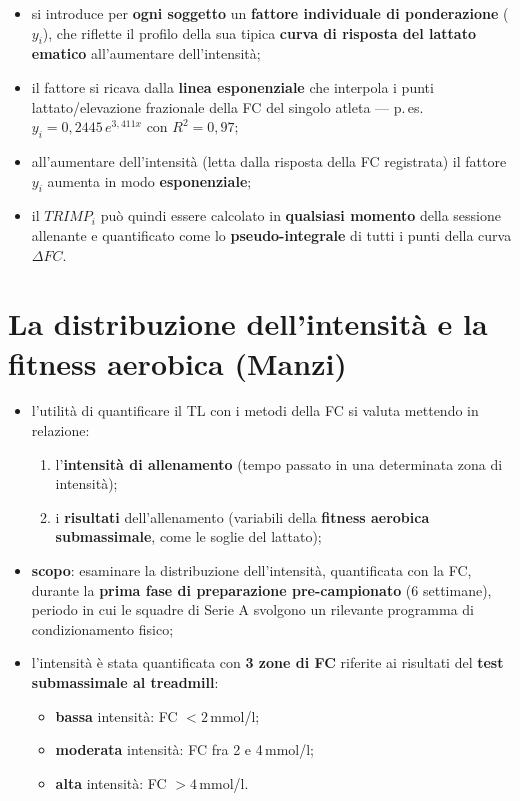 \begin{itemize}
  \item si introduce per \textbf{ogni soggetto} un \textbf{fattore individuale di ponderazione}
    ($y_i$), che riflette il profilo della sua tipica \textbf{curva di risposta del lattato ematico}
    all'aumentare dell'intensità;
  \item il fattore si ricava dalla \textbf{linea esponenziale} che interpola i punti
    lattato/elevazione frazionale della FC del singolo atleta --- p.\,es.\
    $y_i = 0{,}2445\,e^{3{,}411x}$ con $R^2 = 0{,}97$;
  \item all'aumentare dell'intensità (letta dalla risposta della FC registrata) il fattore $y_i$
    aumenta in modo \textbf{esponenziale};
  \item il \textbf{$TRIMP_i$} può quindi essere calcolato in \textbf{qualsiasi momento} della
    sessione allenante e quantificato come lo \textbf{pseudo-integrale} di tutti i punti della curva
    $\Delta FC$.
\end{itemize}

\section{La distribuzione dell'intensità e la fitness aerobica (Manzi)}

\begin{itemize}
  \item l'utilità di quantificare il TL con i metodi della FC si valuta mettendo in relazione:
    \begin{enumerate}
      \item l'\textbf{intensità di allenamento} (tempo passato in una determinata zona di intensità);
      \item i \textbf{risultati} dell'allenamento (variabili della \textbf{fitness aerobica
        submassimale}, come le soglie del lattato);
    \end{enumerate}
  \item \textbf{scopo}: esaminare la distribuzione dell'intensità, quantificata con la FC, durante la
    \textbf{prima fase di preparazione pre-campionato} (6 settimane), periodo in cui le squadre di
    Serie A svolgono un rilevante programma di condizionamento fisico;
  \item l'intensità è stata quantificata con \textbf{3 zone di FC} riferite ai risultati del
    \textbf{test submassimale al treadmill}:
    \begin{itemize}
      \item \textbf{bassa} intensità: FC $<2$\,mmol/l;
      \item \textbf{moderata} intensità: FC fra 2 e 4\,mmol/l;
      \item \textbf{alta} intensità: FC $>4$\,mmol/l.
    \end{itemize}
\end{itemize}

